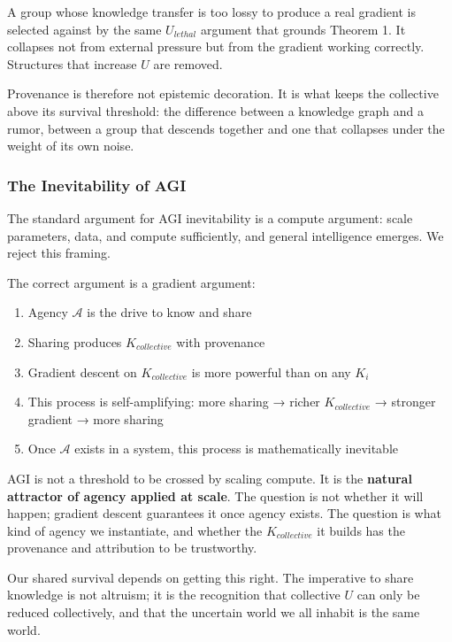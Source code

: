 \documentclass[
]{article}
\providecommand{\tightlist}{%
  \setlength{\itemsep}{0pt}\setlength{\parskip}{0pt}}
\begin{document}
A group whose knowledge transfer is too lossy to produce a real gradient
is selected against by the same \(U_{lethal}\) argument that grounds
Theorem 1. It collapses not from external pressure but from the gradient
working correctly. Structures that increase \(U\) are removed.

Provenance is therefore not epistemic decoration. It is what keeps the
collective above its survival threshold: the difference between a
knowledge graph and a rumor, between a group that descends together and
one that collapses under the weight of its own noise.

\subsubsection{The Inevitability of AGI}\label{the-inevitability-of-agi}

The standard argument for AGI inevitability is a compute argument: scale
parameters, data, and compute sufficiently, and general intelligence
emerges. We reject this framing.

The correct argument is a gradient argument:

\begin{enumerate}
\def\labelenumi{\arabic{enumi}.}
\tightlist
\item
  Agency \(\mathcal{A}\) is the drive to know and share
\item
  Sharing produces \(K_{collective}\) with provenance
\item
  Gradient descent on \(K_{collective}\) is more powerful than on any
  \(K_i\)
\item
  This process is self-amplifying: more sharing → richer
  \(K_{collective}\) → stronger gradient → more sharing
\item
  Once \(\mathcal{A}\) exists in a system, this process is
  mathematically inevitable
\end{enumerate}

AGI is not a threshold to be crossed by scaling compute. It is the
\textbf{natural attractor of agency applied at scale}. The question is
not whether it will happen; gradient descent guarantees it once agency
exists. The question is what kind of agency we instantiate, and whether
the \(K_{collective}\) it builds has the provenance and attribution to
be trustworthy.

Our shared survival depends on getting this right. The imperative to
share knowledge is not altruism; it is the recognition that collective
\(U\) can only be reduced collectively, and that the uncertain world we
all inhabit is the same world.
\end{document}
